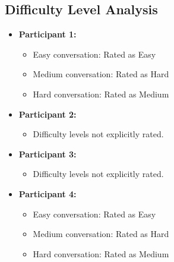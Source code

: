 \documentclass{article}
\begin{document}
\subsection{Difficulty Level Analysis}
\begin{itemize}
    \item \textbf{Participant 1:}
    \begin{itemize}
        \item Easy conversation: Rated as Easy
        \item Medium conversation: Rated as Hard
        \item Hard conversation: Rated as Medium
    \end{itemize}
    \item \textbf{Participant 2:}
    \begin{itemize}
        \item Difficulty levels not explicitly rated.
    \end{itemize}
    \item \textbf{Participant 3:}
    \begin{itemize}
        \item Difficulty levels not explicitly rated.
    \end{itemize}
    \item \textbf{Participant 4:}
    \begin{itemize}
        \item Easy conversation: Rated as Easy
        \item Medium conversation: Rated as Hard
        \item Hard conversation: Rated as Medium
    \end{itemize}
\end{itemize}
\end{document}
